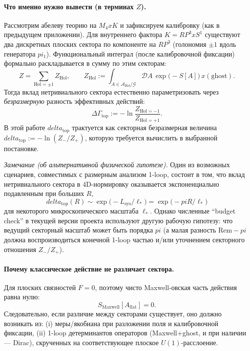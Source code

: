 \documentclass[12pt]{article}
\def\mathbb#1{#1}%
\def\pi{pi}%
\def\delta{delta}%
\def\times{x}%
\begin{document}
\paragraph{Что именно нужно вывести (в терминах $Z$).}
Рассмотрим абелеву теорию на $M_4\times K$ и зафиксируем калибровку (как в предыдущем приложении).
Для внутреннего фактора $K=\mathbb{RP}^3\times S^1$ существуют два дискретных плоских сектора по компоненте на $\mathbb{RP}^3$ (голономия $\pm 1$ вдоль генератора $\pi_1$).
Функциональный интеграл (после калибровочной фиксации) формально раскладывается в сумму по этим секторам:
\begin{equation}
  Z
  =
  \sum_{\mathrm{Hol}=\pm 1} Z_{\mathrm{Hol}},
  \qquad
  Z_{\mathrm{Hol}}:=\int_{A\in\mathcal{A}_{\mathrm{Hol}}/\mathcal{G}}\!\mathcal{D}A\,\exp\bigl(-S[A]\bigr)\,\times(\text{ghost}).
\end{equation}
Тогда вклад нетривиального сектора естественно параметризовать через \emph{безразмерную} разность эффективных действий:
\begin{equation}\label{eq:DeltaGamma_top_def}
  \Delta\Gamma_{\mathrm{top}}
  :=
  -\ln\frac{Z_{\mathrm{Hol}=-1}}{Z_{\mathrm{Hol}=+1}}.
\end{equation}
В этой работе $\delta_{\mathrm{top}}$ трактуется как секторная безразмерная величина
$\delta_{\mathrm{top}}:=-\ln(Z_{-}/Z_{+})$, которую требуется вычислить в выбранной постановке.

\emph{Замечание (об альтернативной физической гипотезе).}
Один из возможных сценариев, совместимых с размерным анализом 1-loop, состоит в том, что вклад нетривиального сектора в 4D-нормировку оказывается экспоненциально подавленным при больших $R$,
\begin{equation}
  \delta_{\mathrm{top}}(R)\sim \exp\bigl(-L_{\mathrm{sys}}/\ell_{\ast}\bigr)=\exp\bigl(-\pi R/\ell_{\ast}\bigr)
\end{equation}
для некоторого микроскопического масштаба $\ell_{\ast}$.
Однако численные ``budget check'' в текущей версии проекта используют другую рабочую гипотезу: что ведущий секторный масштаб может быть порядка $\pi$ (а малая разность $\mathrm{Rem}-\pi$ должна воспроизводиться конечной 1-loop частью и/или уточнением секторного отношения $Z_{-}/Z_{+}$).

\paragraph{Почему классическое действие не различает сектора.}
Для плоских связностей $F=0$, поэтому чисто Maxwell-овская часть действия равна нулю:
\begin{equation}
  S_{\mathrm{Maxwell}}[A_{\mathrm{flat}}]=0.
\end{equation}
Следовательно, если различие между секторами существует, оно должно возникать из:
(i) меры/якобиана при разложении поля и калибровочной фиксации,
(ii) 1-loop детерминантов операторов (Maxwell+ghost, и при наличии --- Dirac), скрученных на соответствующее плоское $U(1)$-расслоение.
\end{document}
